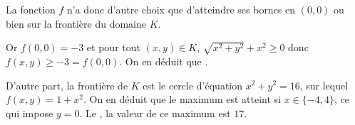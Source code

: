 {\begin{enumerate}
{La fonction $f$ n'a donc d'autre choix que d'atteindre ses bornes en $(0,0)$ ou bien sur la frontière du domaine $K$. 
			
Or $f(0,0) = -3$ et pour tout $(x,y) \in K$, $\sqrt{x^2+y^2}+x^2 \geq 0$ donc $f(x,y) \geq -3 = f(0,0)$. On en déduit que .
			
D'autre part, la frontière de $K$ est le cercle d'équation $x^2+y^2=16$, sur lequel $f(x,y) = 1+x^2$. On en déduit que le maximum est atteint si $x \in \{-4,4\}$, ce qui impose $y=0$. Le , la valeur de ce maximum est $17$. }
	\end{enumerate}

}
